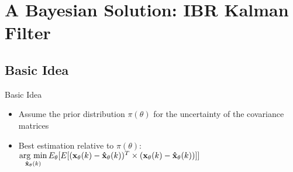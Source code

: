\section{A Bayesian Solution: IBR Kalman Filter}
\begin{frame}
    \tableofcontents[currentsection]
\end{frame}

\subsection{Basic Idea}
\begin{frame}{Basic Idea}
    \begin{itemize}
        \item Assume the prior distribution $\pi(\theta)$ for the uncertainty of the covariance matrices
        \item Best estimation relative to $\pi(\theta)$: $\mathop{\rm arg~min}\limits_{{\bf \hat x_\theta}(k)} E_\theta[E[({\bf x_\theta}(k) - {\bf \hat x_\theta}(k))^T\times ({\bf x_\theta}(k) - {\bf \hat x_\theta}(k))]]$
    \end{itemize}
\end{frame}


